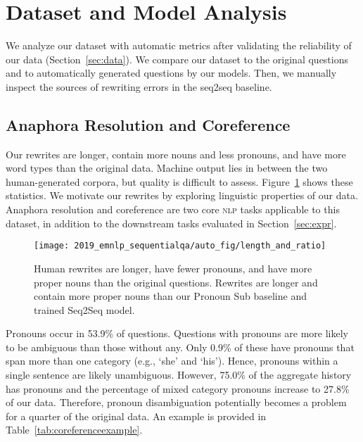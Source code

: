 
\section{Dataset and Model Analysis}

\label{sec:analysis}

We analyze our dataset with automatic metrics after validating the reliability of our data (Section~\ref{sec:data}).
We compare our dataset to the original \abr{\quac} questions and to automatically generated questions by our models. Then, we manually inspect the sources of rewriting errors in the seq2seq baseline.

\subsection{Anaphora Resolution and Coreference}
Our rewrites are longer, contain more nouns and less pronouns, and have more  word types than the original data. 
Machine output lies in between the two human-generated corpora, but quality is difficult to assess. 
Figure~\ref{fig:bargraph} shows these statistics.  
We motivate our rewrites by exploring linguistic properties of our
data. 
Anaphora resolution and coreference are two core \textsc{nlp} tasks applicable to this dataset, in addition to the downstream tasks evaluated in Section~\ref{sec:expr}.  




\begin{figure}[t!]
  \centering
	\texttt{[image: 2019\_emnlp\_sequentialqa/auto\_fig/length\_and\_ratio]}
	\caption{Human rewrites are longer, have fewer pronouns, and
          have more proper nouns than the original \abr{\quac} questions.
Rewrites are longer and contain more proper nouns than our Pronoun Sub
baseline and trained Seq2Seq model.}
	\label{fig:bargraph}
\end{figure}

    
Pronouns occur in 53.9\% of \abr{\quac} questions.  Questions with pronouns are more likely to be ambiguous than those without any.   
 Only 0.9\% of these have pronouns that span more than one category
 (e.g., `she' and `his').  Hence, pronouns within a single sentence are likely unambiguous.  
 However, 75.0\% of the aggregate history has pronouns and the percentage of mixed category pronouns increase to 27.8\% of our data.  Therefore, pronoun disambiguation potentially becomes a problem for a quarter of the original data.  An example is provided in Table~\ref{tab:coreferenceexample}.


